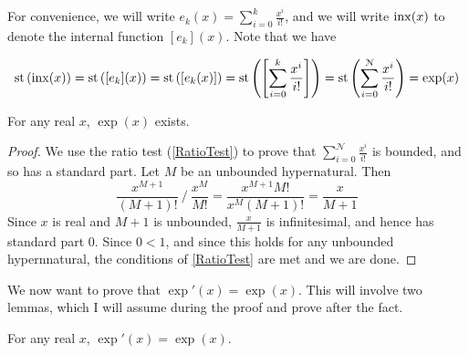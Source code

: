 For convenience, we will write $e_k(x) = \sum_{i=0}^k \frac{x^i}{i!}$, and we will write $\operatorname{inx}(x)$ to denote the internal function $[e_k](x)$. Note that we have

\[\operatorname{st}\left(\operatorname{inx}(x)\right) = \operatorname{st}\left([e_k](x)\right) = \operatorname{st}\left([e_k(x)]\right) = \operatorname{st}\left(\left[\sum_{i=0}^k\frac{x^i}{i!}\right]\right) = \operatorname{st}\left(\sum_{i=0}^\mathcal{N} \frac{x^i}{i!}\right) = \exp(x) \]

\begin{thm}\label{expExists}
    For any real $x$, $\exp(x)$ exists.
\end{thm}

\begin{proof}
    We use the ratio test (\ref{RatioTest}) to prove that $\sum_{i=0}^\mathcal{N} \frac{x^i}{i!}$ is bounded, and so has a standard part. Let $M$ be an unbounded hypernatural. Then 
    \[
        \frac{x^{M+1}}{(M+1)!} \  / \  \frac{x^M}{M!} = \frac{x^{M+1}M!}{x^M (M+1)!} 
        = \frac{x}{M+1}
    \]
    Since $x$ is real and $M+1$ is unbounded, $\frac{x}{M+1}$ is infinitesimal, and hence has standard part $0$. Since $0 < 1$, and since this holds for any unbounded hypernnatural, the conditions of \ref{RatioTest} are met and we are done.
\end{proof}

We now want to prove that $\exp'(x) = \exp(x)$. This will involve two lemmas, which I will assume during the proof and prove after the fact.

\begin{thm}
    For any real $x$, $\exp'(x) = \exp(x)$.
\end{thm}

